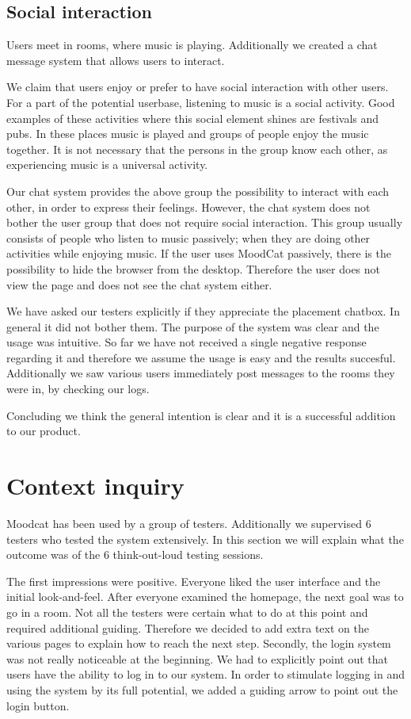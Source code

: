 \subsection{Social interaction}

Users meet in rooms, where music is playing.
Additionally we created a chat message system that allows users to interact.

We claim that users enjoy or prefer to have social interaction with other users.
For a part of the potential userbase, listening to music is a social activity.
Good examples of these activities where this social element shines are festivals and pubs.
In these places music is played and groups of people enjoy the music together.
It is not necessary that the persons in the group know each other, as experiencing music is a universal activity.

Our chat system provides the above group the possibility to interact with each other, in order to express their feelings.
However, the chat system does not bother the user group that does not require social interaction.
This group usually consists of people who listen to music passively; when they are doing other activities while enjoying music.
If the user uses MoodCat passively, there is the possibility to hide the  browser from the desktop.
Therefore the user does not view the page and does not see the chat system either.

We have asked our testers explicitly if they appreciate the placement chatbox.
In general it did not bother them.
The purpose of the system was clear and the usage was intuitive.
So far we have not received a single negative response regarding it and therefore we assume the usage is easy and the results succesful.
Additionally we saw various users immediately post messages to the rooms they were in, by checking our logs.

Concluding we think the general intention is clear and it is a successful addition to our product.

\section{Context inquiry}
Moodcat has been used by a group of testers.
Additionally we supervised 6 testers who tested the system extensively.
In this section we will explain what the outcome was of the 6 think-out-loud testing sessions.

The first impressions were positive.
Everyone liked the user interface and the initial look-and-feel.
After everyone examined the homepage, the next goal was to go in a room.
Not all the testers were certain what to do at this point and required additional guiding.
Therefore we decided to add extra text on the various pages to explain how to reach the next step.
Secondly, the login system was not really noticeable at the beginning.
We had to explicitly point out that users have the ability to log in to our system.
In order to stimulate logging in and using the system by its full potential, we added a guiding arrow to point out the login button.

